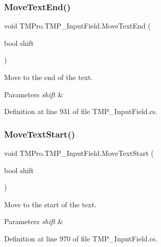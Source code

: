 \subsubsection{\texorpdfstring{MoveTextEnd()}{MoveTextEnd()}}
{\footnotesize\ttfamily void T\+M\+Pro.\+T\+M\+P\+\_\+\+Input\+Field.\+Move\+Text\+End (\begin{DoxyParamCaption}\item[{bool}]{shift }\end{DoxyParamCaption})}



Move to the end of the text. 


\begin{DoxyParams}{Parameters}
{\em shift} & \\
\hline
\end{DoxyParams}


Definition at line 931 of file T\+M\+P\+\_\+\+Input\+Field.\+cs.

\mbox{\label{class_t_m_pro_1_1_t_m_p___input_field_aff69df0c224c73b666addf48c10eec44}} 
\subsubsection{\texorpdfstring{MoveTextStart()}{MoveTextStart()}}
{\footnotesize\ttfamily void T\+M\+Pro.\+T\+M\+P\+\_\+\+Input\+Field.\+Move\+Text\+Start (\begin{DoxyParamCaption}\item[{bool}]{shift }\end{DoxyParamCaption})}



Move to the start of the text. 


\begin{DoxyParams}{Parameters}
{\em shift} & \\
\hline
\end{DoxyParams}


Definition at line 970 of file T\+M\+P\+\_\+\+Input\+Field.\+cs.

\mbox{\label{class_t_m_pro_1_1_t_m_p___input_field_a817cdcf34d7711275ffa8643b02a73fa}} 
